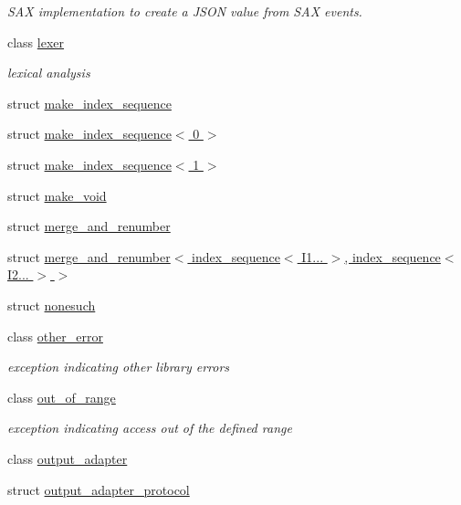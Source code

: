 \begin{DoxyCompactItemize}
\begin{DoxyCompactList}\small\item\em S\+AX implementation to create a J\+S\+ON value from S\+AX events. \end{DoxyCompactList}\item 
class \hyperlink{classnlohmann_1_1detail_1_1lexer}{lexer}
\begin{DoxyCompactList}\small\item\em lexical analysis \end{DoxyCompactList}\item 
struct \hyperlink{structnlohmann_1_1detail_1_1make__index__sequence}{make\+\_\+index\+\_\+sequence}
\item 
struct \hyperlink{structnlohmann_1_1detail_1_1make__index__sequence_3_010_01_4}{make\+\_\+index\+\_\+sequence$<$ 0 $>$}
\item 
struct \hyperlink{structnlohmann_1_1detail_1_1make__index__sequence_3_011_01_4}{make\+\_\+index\+\_\+sequence$<$ 1 $>$}
\item 
struct \hyperlink{structnlohmann_1_1detail_1_1make__void}{make\+\_\+void}
\item 
struct \hyperlink{structnlohmann_1_1detail_1_1merge__and__renumber}{merge\+\_\+and\+\_\+renumber}
\item 
struct \hyperlink{structnlohmann_1_1detail_1_1merge__and__renumber_3_01index__sequence_3_01I1_8_8_8_01_4_00_01inde4885d6f1d93a04f25932afbd429c4793}{merge\+\_\+and\+\_\+renumber$<$ index\+\_\+sequence$<$ I1... $>$, index\+\_\+sequence$<$ I2... $>$ $>$}
\item 
struct \hyperlink{structnlohmann_1_1detail_1_1nonesuch}{nonesuch}
\item 
class \hyperlink{classnlohmann_1_1detail_1_1other__error}{other\+\_\+error}
\begin{DoxyCompactList}\small\item\em exception indicating other library errors \end{DoxyCompactList}\item 
class \hyperlink{classnlohmann_1_1detail_1_1out__of__range}{out\+\_\+of\+\_\+range}
\begin{DoxyCompactList}\small\item\em exception indicating access out of the defined range \end{DoxyCompactList}\item 
class \hyperlink{classnlohmann_1_1detail_1_1output__adapter}{output\+\_\+adapter}
\item 
struct \hyperlink{structnlohmann_1_1detail_1_1output__adapter__protocol}{output\+\_\+adapter\+\_\+protocol}

\end{DoxyCompactItemize}

